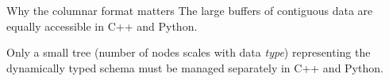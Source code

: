 \documentclass[aspectratio=169]{beamer}
\begin{document}
\begin{frame}{Why the columnar format matters}
\large
\vspace{0.35 cm}
The large buffers of contiguous data are equally accessible in C++ and Python.

\vspace{0.25 cm}
Only a small tree (number of nodes scales with data {\it type}) representing the dynamically typed schema must be managed separately in C++ and Python.

\begin{columns}
\end{columns}
\end{frame}
\end{document}

